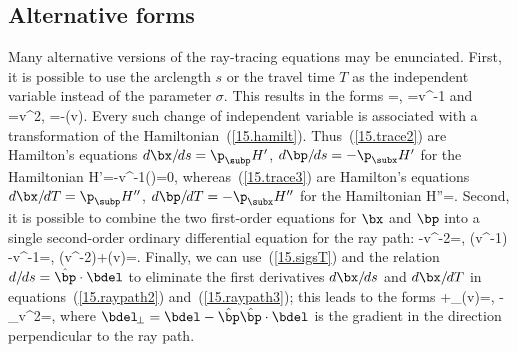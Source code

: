 \subsection{Alternative forms}
\renewcommand{\thesubsection}{\arabic{chapter}.\arabic{section}.\arabic{subsection}}

Many alternative versions of the ray-tracing
equations may be enunciated.  First, it is possible to
use the arclength $s$ or the travel time $T$
as the independent variable instead of the
parameter $\sigma$.  This results in the forms
\eq \label{15.trace2}
=\hat{\bp},\qquad
{}=\bdel v^{-1}
\en
and
\eq \label{15.trace3}
=v^2\bp,\qquad
{}=-\bdel (\ln v).
\en
Every such change of independent variable
is associated with a transformation of the
Hamiltonian~(\ref{15.hamilt}).  Thus~(\ref{15.trace2})
are Hamilton's equations $d\bx/\hspace{-0.3 mm}ds=\p_{\subp}H'$,
$d\bp/\hspace{-0.3 mm}ds=-\p_{\subx}H'$ for the Hamiltonian
\eq
H'=\sqrt{\bp\cdot\bp}-v^{-1}(\bx)=0,
\en
whereas~(\ref{15.trace3}) are Hamilton's equations
$d\bx/\hspace{-0.3 mm}dT=\p_{\subp}H''$,
$d\bp/\hspace{-0.3 mm}dT=-\p_{\subx}H''$ for the Hamiltonian
\eq
H''=.
\en
Second, it is possible to combine the two first-order
equations for $\bx$ and $\bp$ into a single second-order
ordinary differential equation for the ray path:
\eq \label{15.raypath1}
-\half\bdel v^{-2}=\bzero,
\en
\eq \label{15.raypath2}
\left(v^{-1}\right)
-\bdel v^{-1}=\bzero,
\en
\eq \label{15.raypath3}
\left(v^{-2}\right)+\bdel (\ln v)=\bzero.
\en
Finally, we can use~(\ref{15.sigsT}) and the relation
$d/\hspace{-0.3 mm}ds=\hat{\bp}\cdot\bdel$ to eliminate
the first derivatives $d\bx/\hspace{-0.3 mm}ds$ and
$d\bx/\hspace{-0.3 mm}dT$ in equations~(\ref{15.raypath2})
and~(\ref{15.raypath3}); this leads to the forms
\eq \label{15.raypath4}
+\bdel_{\!\perp}(\ln v)=\bzero,\qquad
{}-\half\bdel_{\!\perp}v^2=\bzero,
\en
where $\bdel_{\!\perp}=\bdel-\hat{\bp}\hat{\bp}\cdot\bdel$ is
the gradient in the direction perpendicular to the ray path.

